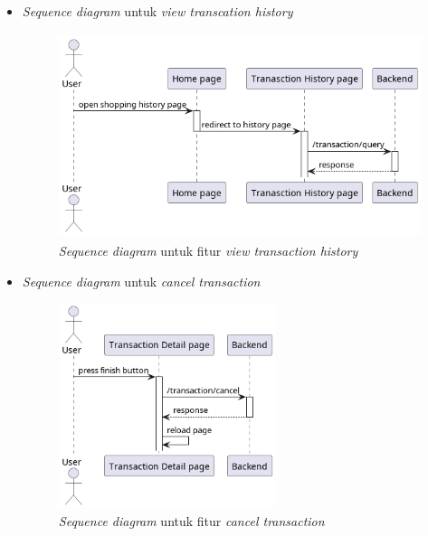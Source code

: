 \documentclass[a4paper]{article}
\begin{document}
\begin{enumerate}
\begin{enumerate}
\begin{itemize}
            \newpage
            \item \textit{Sequence diagram} untuk \textit{view transcation history}
            \begin{figure}[h]
                \centering
                \includegraphics*[height=6cm]{diagram/sequence diagram/FE/15. transaction/view transaction history/template.png}
                \caption{\textit{Sequence diagram} untuk fitur \textit{view transaction history}}
            \end{figure}

            \item \textit{Sequence diagram} untuk \textit{cancel transaction}
            \begin{figure}[h]
                \centering
                \includegraphics*[height=6cm]{diagram/sequence diagram/FE/15. transaction/cancel transaction/template.png}
                \caption{\textit{Sequence diagram} untuk fitur \textit{cancel transaction}}
            \end{figure}


\end{itemize}
\end{enumerate}
\end{enumerate}
\end{document}
